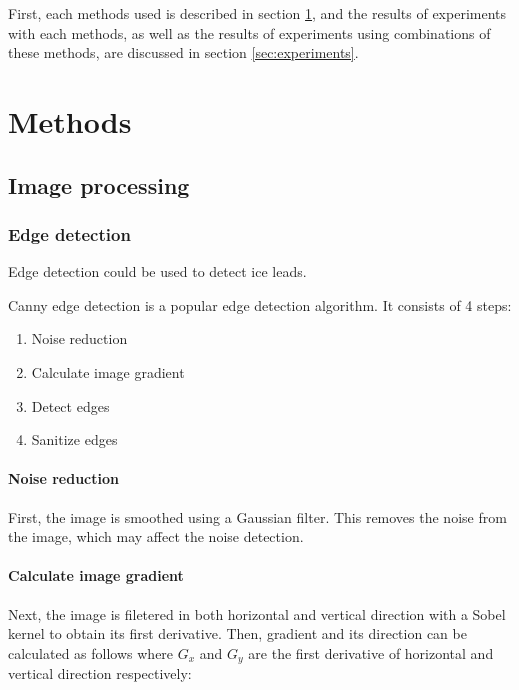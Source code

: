 \documentclass{article}
\begin{document}
First, each methods used is described in section \ref{sec:methods},
and the results of experiments with each methods,
as well as the results of experiments using combinations of these methods,
are discussed in section \ref{sec:experiments}.

\section{Methods} \label{sec:methods}
    \subsection{Image processing}
        \subsubsection{Edge detection}
            Edge detection could be used to detect ice leads.

            Canny edge detection \cite{edge} is a popular edge detection algorithm.
            It consists of 4 steps:
            \begin{enumerate}
                \item Noise reduction
                \item Calculate image gradient
                \item Detect edges
                \item Sanitize edges
            \end{enumerate}

            \paragraph{Noise reduction}
                First, the image is smoothed using a Gaussian filter.
                This removes the noise from the image,
                which may affect the noise detection.

            \paragraph{Calculate image gradient}
                Next, the image is filetered in both horizontal and vertical direction
                with a Sobel kernel to obtain its first derivative.
                Then, gradient and its direction can be calculated as follows
                where $G_x$ and $G_y$ are the first derivative of horizontal
                and vertical direction respectively:
\end{document}

